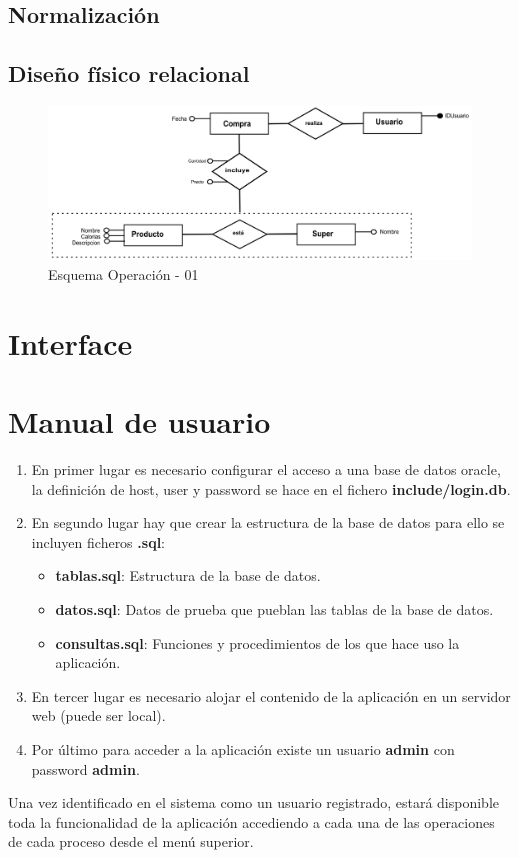 \documentclass[a4paper,12pt]{report}
\begin{document}
\section{Normalización}
\label{sec-8-2}

\section{Diseño físico relacional}
\label{sec-8-3}
\begin{figure}[!htp]
\centering
\includegraphics[width=0.9\linewidth]{./operaciones/img/Compras/01_ope.png}
\caption{Esquema Operación - 01}
\label{fig:ope01}
\medskip
\footnotesize
{}
\end{figure}


\chapter{Interface}
\label{sec-9}

\chapter{Manual de usuario}
\label{sec-10}
\begin{enumerate}
\item En primer lugar es necesario configurar el acceso a una base de
datos oracle, la definición de host, user y password se hace en
el fichero \textbf{include/login.db}.
\item En segundo lugar hay que crear la estructura de la base de datos
para ello se incluyen ficheros \textbf{.sql}:
\begin{itemize}
\item \textbf{tablas.sql}: Estructura de la base de datos.
\item \textbf{datos.sql}: Datos de prueba que pueblan las tablas de la base
de datos.
\item \textbf{consultas.sql}: Funciones y procedimientos de los que hace
uso la aplicación.
\end{itemize}
\item En tercer lugar es necesario alojar el contenido de la
aplicación en un servidor web (puede ser local).
\item Por último para acceder a la aplicación existe un usuario
      \textbf{admin} con password \textbf{admin}.
\end{enumerate}


Una vez identificado en el sistema como un usuario registrado,
estará disponible toda la funcionalidad de la aplicación accediendo
a cada una de las operaciones de cada proceso desde el menú superior.
\end{document}
